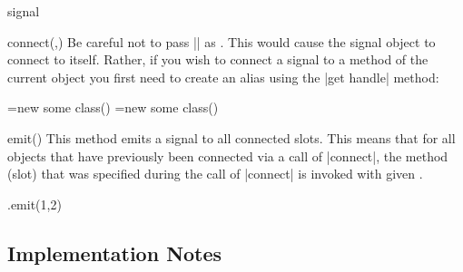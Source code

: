 \begin{ooclass}{signal}
\begin{method}{connect(,)}
        Be careful not to pass |\pgfoothis| as . This would
        cause the signal object to connect to itself. Rather, if you wish to
        connect a signal to a method of the current object you first need to
        create an alias using the |get handle| method:
\begin{codeexample}
\pgfoonew \objA=new some class()
\pgfoonew \objB=new some class()
\end{codeexample}
    \end{method}

    \begin{method}{emit()}
        This method emits a signal to all connected slots. This means that for
        all objects that have previously been connected via a call of
        |connect|, the method (slot) that was specified during the call of
        |connect| is invoked with given .
\begin{codeexample}
\anothersignal.emit(1,2)
\end{codeexample}
    \end{method}
\end{ooclass}


\subsection{Implementation Notes}

